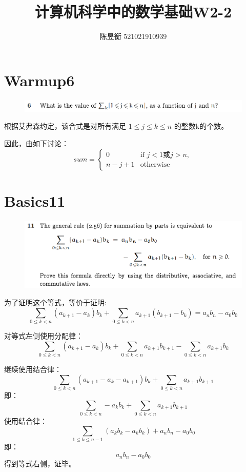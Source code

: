 \documentclass[]{article}
\title{计算机科学中的数学基础W2-2}
\author{陈昱衡 521021910939}
\begin{document}
\maketitle



\section*{Warmup6}
\begin{figure}[hbt]
\includegraphics[scale=1]{Q1}
\end{figure}
根据艾弗森约定，该合式是对所有满足 $1 \le j \le k \le n$ 的整数k的个数。\par 
因此，由如下讨论：
\[ sum = \left\{ \begin{array}{rl} 0 & \text{if } j < 1 或 j > n,\\ n - j + 1 & \text{otherwise}  \end{array} \right. \]




\section*{Basics11}
\begin{figure}[hbt]
	\includegraphics[scale=1]{Q3}
\end{figure}
为了证明这个等式，等价于证明:
\begin{equation}
	\sum_{0 \le k < n} (a_{k+1} - a_{k})b_{k} + \sum_{0 \le k < n}a_{k+1}(b_{k+1} - b_{k}) = a_{n}b_{n} - a_{0}b_{0}
\end{equation}

对等式左侧使用分配律：
\begin{equation}
	\sum_{0 \le k < n} (a_{k+1} - a_{k})b_{k} + \sum_{0 \le k < n}a_{k+1}b_{k+1} - \sum_{0 \le k < n}a_{k+1}b_{k} 
\end{equation}

继续使用结合律：
\begin{equation}
	\sum_{0 \le k < n} (a_{k+1} - a_{k} -a_{k+1})b_{k} + \sum_{0 \le k < n}a_{k+1}b_{k+1}
\end{equation}
即：
\begin{equation}
	\sum_{0 \le k < n}- a_{k}b_{k} + \sum_{0 \le k < n}a_{k+1}b_{k+1}
\end{equation}
使用结合律：
\begin{equation}
	\sum_{1 \le k \le n-1} (a_{k}b_{k} - a_{k}b_{k})  + a_{n}b_{n} - a_{0}b_{0}
\end{equation}
即：
\begin{equation}
	 a_{n}b_{n} - a_{0}b_{0}
\end{equation}
得到等式右侧，证毕。
\end{document}
